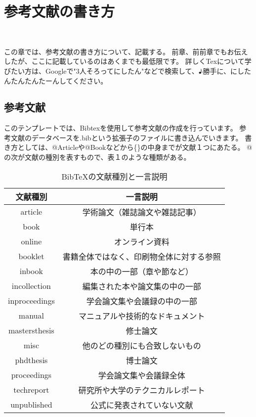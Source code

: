 \chapter{参考文献の書き方}
\vspace{20mm}\hrulefill\\\vspace{20mm}

この章では、参考文献の書き方について、記載する。
前章、前前章でもお伝えしたが、ここに記載しているのはあくまでも最低限です。
詳しくTexについて学びたい方は、Googleで"3人そろってにしたん"などで検索して、♪勝手に、にしたんたんたんたーんしてください。

\newpage

\section{参考文献}

このテンプレートでは、Bibtexを使用して参考文献の作成を行っています。
参考文献のデータベースを.bibという拡張子のファイルに書き込んでいきます。
書き方としては、@Articleや@Bookなどから\{\}の中身までが文献１つにあたる。
@の次が文献の種別を表すもので、表１のような種類がある。

\begin{table}[H]
	\caption{BibTeXの文献種別と一言説明}\label{tab:bibtex-entry-types}
	\vspace{-5mm}
	\begin{center}
		\begin{tabular}{cc}
		\hline
	  	\normalfont\textbf{文献種別} & \normalfont\textbf{一言説明} \\\hline
	  	article & 学術論文（雑誌論文や雑誌記事） \\
	  	book & 単行本 \\
		online & オンライン資料 \\
	  	booklet & 書籍全体ではなく、印刷物全体に対する参照 \\
	  	inbook & 本の中の一部（章や節など） \\
	  	incollection & 編集された本や論文集の中の一部 \\
	  	inproceedings & 学会論文集や会議録の中の一部 \\
	  	manual & マニュアルや技術的なドキュメント \\
	  	mastersthesis & 修士論文 \\
	  	misc & 他のどの種別にも合致しないもの \\
	  	phdthesis & 博士論文 \\
	  	proceedings & 学会論文集や会議録全体 \\
	  	techreport & 研究所や大学のテクニカルレポート \\
	  	unpublished & 公式に発表されていない文献 \\\hline
		\end{tabular}
	\end{center}
\end{table}